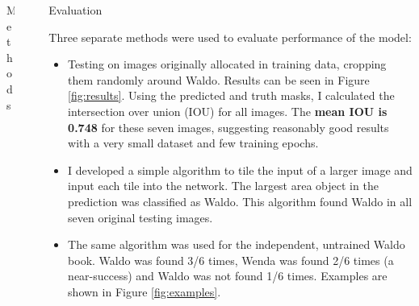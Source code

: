 \documentclass[final]{beamer}
\newlength{\sepwid}
\newlength{\onecolwid}
\newlength{\twocolwid}
\begin{document}
\begin{frame}[t]
\begin{columns}[t]
\begin{column}{\onecolwid}
\begin{block}{Methods}
\end{block}

\end{column}



\begin{column}{\sepwid}\end{column} %

\begin{column}{\twocolwid} %




\begin{block}{Evaluation}

Three separate methods were used to evaluate performance of the model: 
\begin{itemize}
    \item Testing on images originally allocated in training data, cropping them randomly around Waldo. Results can be seen in Figure \ref{fig:results}. Using the predicted and truth masks, I calculated the intersection over union (IOU) for all images. The \textbf{mean IOU is 0.748} for these seven images, suggesting reasonably good results with a very small dataset and few training epochs. 
    
    \item I developed a simple algorithm to tile the input of a larger image and input each tile into the network. The largest area object in the prediction was classified as Waldo. This algorithm found Waldo in all seven original testing images.
    
    \item The same algorithm was used for the independent, untrained Waldo book. Waldo was found 3/6 times, Wenda was found 2/6 times (a near-success) and Waldo was not found 1/6 times. Examples are shown in Figure \ref{fig:examples}.
\end{itemize}

\end{block}




\end{column}
\end{columns}
\end{frame}
\end{document}
